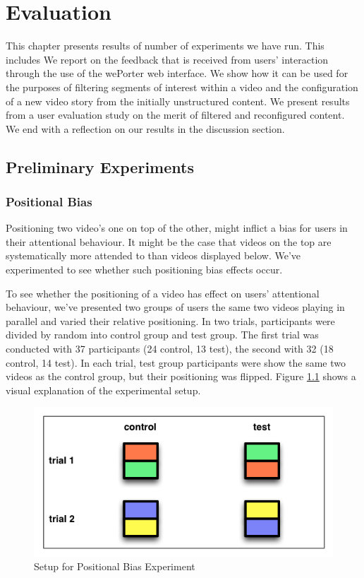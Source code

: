 \chapter{Evaluation}
\label{ch:evaluation}
 

This chapter presents results of number of experiments we have run. This includes 
We report on the feedback that is received from users' interaction through the use of the wePorter web interface. We show how it can be used for the purposes of filtering segments of interest within a video and the configuration of a new video story from the initially unstructured content. We present results from a user evaluation study on the merit of filtered and reconfigured content. We end with a reflection on our results in the discussion section.




\section{Preliminary Experiments}
\label{sec:preliminary_experiments}

\subsection{Positional Bias}
Positioning two video's one on top of the other, might inflict a bias for users in their attentional behaviour. It might be the case that videos on the top are systematically more attended to than videos displayed below. We've experimented to see whether such positioning bias effects occur.

To see whether the positioning of a video has effect on users' attentional behaviour, we've presented two groups of users the same two videos playing in parallel and varied their relative positioning. In two trials, participants were divided by random into control group and test group. The first trial was conducted with 37 participants (24 control, 13 test), the second with 32 (18 control, 14 test). In each trial, test group participants were show the same two videos as the control group, but their positioning was flipped. Figure \ref{fig:exp_posbias} shows a visual explanation of the experimental setup.

\begin{figure}[htbp]
  \centering
    \includegraphics[width = .7\textwidth]{img/exp_posbias}
  \caption{Setup for Positional Bias Experiment}
  \label{fig:exp_posbias}
\end{figure}


